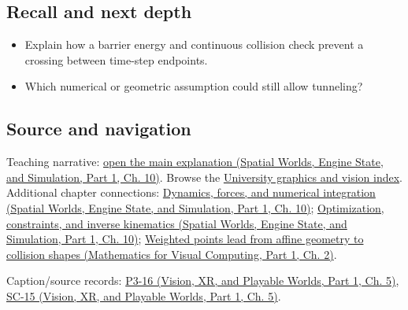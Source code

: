 \subsection{Recall and next depth}\label{appendix-a9ba01fa72a6-recall-and-next-depth}

\hypertarget{appendix-a9ba01fa72a6-recall-and-next-depth}{}

\begin{itemize}
\tightlist
\item
  Explain how a barrier energy and continuous collision check prevent a crossing between time-step endpoints.
\item
  Which numerical or geometric assumption could still allow tunneling?
\end{itemize}

\subsection{Source and navigation}\label{appendix-a9ba01fa72a6-source-and-navigation}

\hypertarget{appendix-a9ba01fa72a6-source-and-navigation}{}

Teaching narrative: \href{../05-Spatial-Worlds-Engine-State-and-Simulation-P01/main.pdf\#04-visual-computing-ii-ch029-dynamics-forces-and-numerical-integration}{open the main explanation (Spatial Worlds, Engine State, and Simulation, Part 1, Ch. 10)}. Browse the \hyperref[appendix-a6d556a4ef50-university-graphics-vision-and-photography---independent-series]{University graphics and vision index}. Additional chapter connections: \href{../05-Spatial-Worlds-Engine-State-and-Simulation-P01/main.pdf\#04-visual-computing-ii-ch029-dynamics-forces-and-numerical-integration}{Dynamics, forces, and numerical integration (Spatial Worlds, Engine State, and Simulation, Part 1, Ch. 10)}; \href{../05-Spatial-Worlds-Engine-State-and-Simulation-P01/main.pdf\#04-visual-computing-ii-ch029-optimization-constraints-and-inverse-kinematics}{Optimization, constraints, and inverse kinematics (Spatial Worlds, Engine State, and Simulation, Part 1, Ch. 10)}; \href{../02-Mathematics-for-Visual-Computing-P01/main.pdf\#01-foundations-i-ch018-weighted-points-lead-from-affine-geometry-to-collision-shapes}{Weighted points lead from affine geometry to collision shapes (Mathematics for Visual Computing, Part 1, Ch. 2)}.

Caption/source records: \href{../07-Vision-XR-and-Playable-Worlds-P01/main.pdf\#04-visual-computing-ii-ch036-p3-16---subdivision-surfaces-part-1}{P3-16 (Vision, XR, and Playable Worlds, Part 1, Ch. 5)}, \href{../07-Vision-XR-and-Playable-Worlds-P01/main.pdf\#04-visual-computing-ii-ch036-sc-15---stanford-cs231n-deep-learning-for-computer-vision-spring-2025-lecture-15-3d-vision}{SC-15 (Vision, XR, and Playable Worlds, Part 1, Ch. 5)}.
